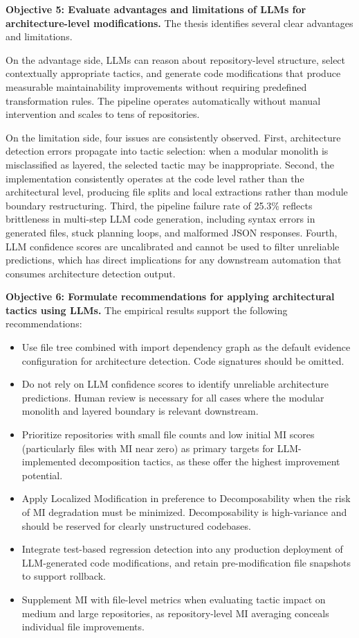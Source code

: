 \textbf{Objective 5: Evaluate advantages and limitations of LLMs for architecture-level modifications.}
The thesis identifies several clear advantages and limitations.

On the advantage side, LLMs can reason about repository-level structure, select contextually appropriate tactics, and generate code modifications that produce measurable maintainability improvements without requiring predefined transformation rules. The pipeline operates automatically without manual intervention and scales to tens of repositories.

On the limitation side, four issues are consistently observed. First, architecture detection errors propagate into tactic selection: when a modular monolith is misclassified as layered, the selected tactic may be inappropriate. Second, the implementation consistently operates at the code level rather than the architectural level, producing file splits and local extractions rather than module boundary restructuring. Third, the pipeline failure rate of 25.3\% reflects brittleness in multi-step LLM code generation, including syntax errors in generated files, stuck planning loops, and malformed JSON responses. Fourth, LLM confidence scores are uncalibrated and cannot be used to filter unreliable predictions, which has direct implications for any downstream automation that consumes architecture detection output.

\textbf{Objective 6: Formulate recommendations for applying architectural tactics using LLMs.}
The empirical results support the following recommendations:

\begin{itemize}
    \item Use file tree combined with import dependency graph as the default evidence configuration for architecture detection. Code signatures should be omitted.
    \item Do not rely on LLM confidence scores to identify unreliable architecture predictions. Human review is necessary for all cases where the modular monolith and layered boundary is relevant downstream.
    \item Prioritize repositories with small file counts and low initial MI scores (particularly files with MI near zero) as primary targets for LLM-implemented decomposition tactics, as these offer the highest improvement potential.
    \item Apply Localized Modification in preference to Decomposability when the risk of MI degradation must be minimized. Decomposability is high-variance and should be reserved for clearly unstructured codebases.
    \item Integrate test-based regression detection into any production deployment of LLM-generated code modifications, and retain pre-modification file snapshots to support rollback.
    \item Supplement MI with file-level metrics when evaluating tactic impact on medium and large repositories, as repository-level MI averaging conceals individual file improvements.
\end{itemize}

